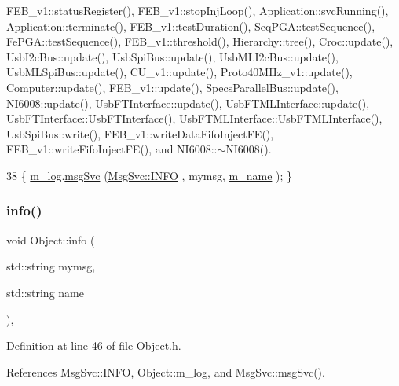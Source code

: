 F\+E\+B\+\_\+v1\+::status\+Register(), F\+E\+B\+\_\+v1\+::stop\+Inj\+Loop(), Application\+::svc\+Running(), Application\+::terminate(), F\+E\+B\+\_\+v1\+::test\+Duration(), Seq\+P\+G\+A\+::test\+Sequence(), Fe\+P\+G\+A\+::test\+Sequence(), F\+E\+B\+\_\+v1\+::threshold(), Hierarchy\+::tree(), Croc\+::update(), Usb\+I2c\+Bus\+::update(), Usb\+Spi\+Bus\+::update(), Usb\+M\+L\+I2c\+Bus\+::update(), Usb\+M\+L\+Spi\+Bus\+::update(), C\+U\+\_\+v1\+::update(), Proto40\+M\+Hz\+\_\+v1\+::update(), Computer\+::update(), F\+E\+B\+\_\+v1\+::update(), Specs\+Parallel\+Bus\+::update(), N\+I6008\+::update(), Usb\+F\+T\+Interface\+::update(), Usb\+F\+T\+M\+L\+Interface\+::update(), Usb\+F\+T\+Interface\+::\+Usb\+F\+T\+Interface(), Usb\+F\+T\+M\+L\+Interface\+::\+Usb\+F\+T\+M\+L\+Interface(), Usb\+Spi\+Bus\+::write(), F\+E\+B\+\_\+v1\+::write\+Data\+Fifo\+Inject\+F\+E(), F\+E\+B\+\_\+v1\+::write\+Fifo\+Inject\+F\+E(), and N\+I6008\+::$\sim$\+N\+I6008().


\begin{DoxyCode}
38 \{ \hyperlink{classObject_a0d269813dd7ac1f24bc143031e2963f2}{m\_log}.\hyperlink{classMsgSvc_ad25f18047920cc59a314e5098259711c}{msgSvc} (\hyperlink{classMsgSvc_ae671eb7301996cd049d2da8a65925926ad2fcf3f3e734fc41ee097cc23670ce51}{MsgSvc::INFO}    , mymsg, \hyperlink{classObject_a8b83c95c705d2c3ba0d081fe1710f48d}{m\_name} ); \}
\end{DoxyCode}
\mbox{\label{classObject_a1ca123253dfd30fc28b156f521dcbdae}} 
\subsubsection{\texorpdfstring{info()}{info()}\hspace{0.1cm}{\footnotesize\ttfamily [2/2]}}
{\footnotesize\ttfamily void Object\+::info (\begin{DoxyParamCaption}\item[{std\+::string}]{mymsg,  }\item[{std\+::string}]{name }\end{DoxyParamCaption})\hspace{0.3cm}{\ttfamily [inline]}, {\ttfamily [inherited]}}



Definition at line 46 of file Object.\+h.



References Msg\+Svc\+::\+I\+N\+FO, Object\+::m\+\_\+log, and Msg\+Svc\+::msg\+Svc().


